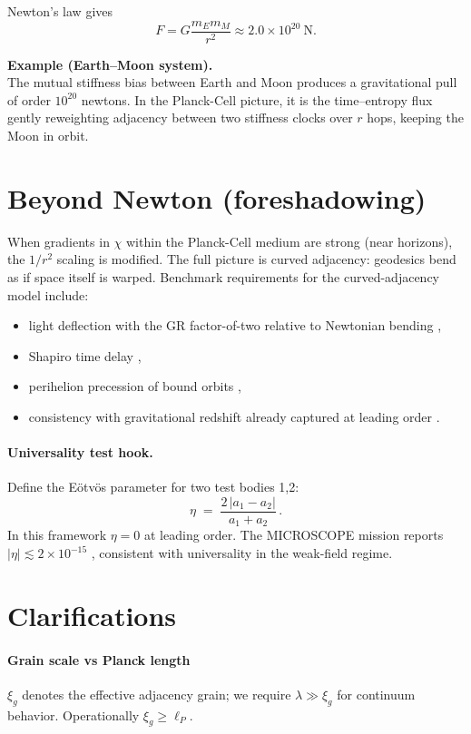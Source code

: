 Newton’s law gives
\[
F = G\frac{m_E m_M}{r^2}
   \approx 2.0\times 10^{20}\ \mathrm{N}.
\]

\begin{tcolorbox}
\textbf{Example (Earth--Moon system).}\\
The mutual stiffness bias between Earth and Moon produces a gravitational pull of order
$10^{20}$ newtons. In the Planck-Cell picture, it is the time--entropy flux gently reweighting
adjacency between two stiffness clocks over $r$ hops, keeping the Moon in orbit.
\end{tcolorbox}

\section*{Beyond Newton (foreshadowing)}
When gradients in $\chi$ within the Planck-Cell medium are strong (near horizons), the $1/r^2$ scaling is modified.
The full picture is curved adjacency: geodesics bend as if space itself is warped.
Benchmark requirements for the curved-adjacency model include:
\begin{itemize}
  \item light deflection with the GR factor-of-two relative to Newtonian bending \cite{eddington1920,will2014confrontation},
  \item Shapiro time delay \cite{will2014confrontation},
  \item perihelion precession of bound orbits \cite{will2014confrontation},
  \item consistency with gravitational redshift already captured at leading order \cite{einstein1916foundation,will2014confrontation}.
\end{itemize}

\paragraph{Universality test hook.}
Define the E\"otv\"os parameter for two test bodies 1,2:
\[
\eta \;=\; \frac{2\,|a_1-a_2|}{a_1+a_2}\,.
\]
In this framework $\eta=0$ at leading order. The MICROSCOPE mission reports $|\eta|\lesssim 2\times 10^{-15}$ \cite{touboul2022microscope}, consistent with universality in the weak-field regime.

\section*{Clarifications}
\paragraph{Grain scale vs Planck length}
\(\xi_g\) denotes the effective adjacency grain; we require \(\lambda\gg\xi_g\) for continuum behavior. Operationally \(\xi_g\ge \ell_P\).
